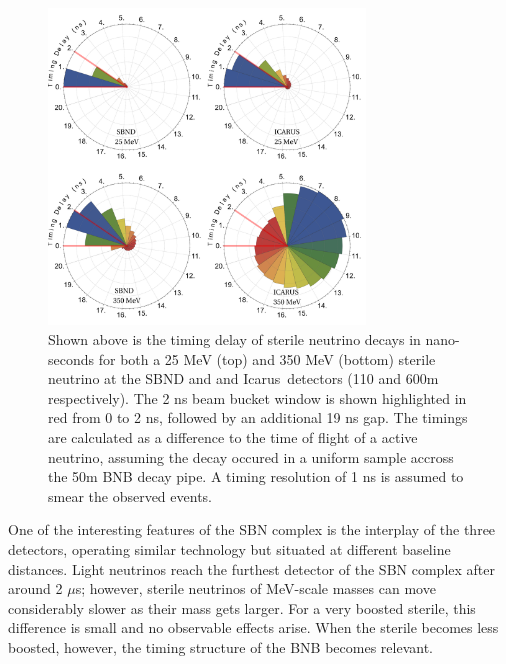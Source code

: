 \documentclass[11pt, a4paper]{article}
\def\icarus{Icarus}
\begin{document}
\begin{figure}[t]
%
\center
%
\includegraphics[width=0.75\textwidth]{figures/timing.pdf}
%
\caption{\label{fig:timing} Shown above is the timing delay of sterile neutrino
decays in nano-seconds for both a 25 MeV (top) and 350 MeV (bottom) sterile
neutrino at the SBND and and \icarus\ detectors (110 and 600m
respectively). The 2 ns beam bucket window is shown highlighted in red from 0
to 2 ns, followed by an additional 19 ns gap. The timings are calculated as a
difference to the time of flight of a active neutrino, assuming the decay
occured in a uniform sample accross the 50m BNB decay pipe. A timing resolution
of 1 ns is assumed to smear the observed events.}
%
\end{figure}

One of the interesting features of the SBN complex is the interplay of the
three detectors, operating similar technology but situated at different
baseline distances.
%
Light neutrinos reach the furthest detector of the SBN complex after around 2
$\mu$s; however, sterile neutrinos of MeV-scale masses can move considerably
slower as their mass gets larger. For a very boosted sterile, this difference
is small and no observable effects arise. When the sterile becomes less
boosted, however, the timing structure of the BNB becomes relevant.
\end{document}
